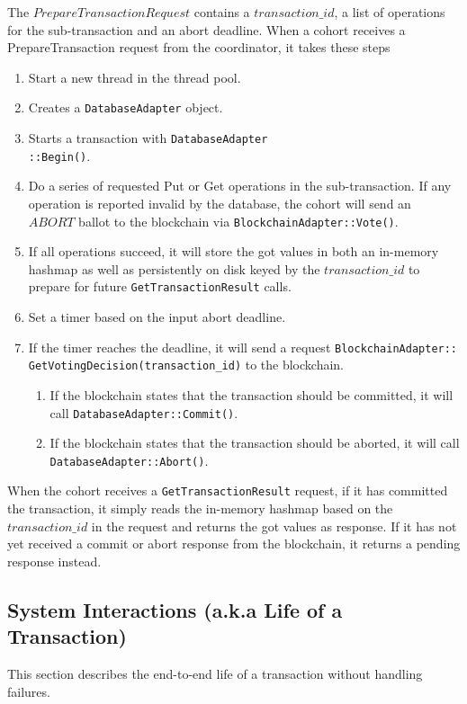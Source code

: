 \documentclass[11pt,conference]{IEEEtran}
\begin{document}
The $PrepareTransactionRequest$ contains a $transaction\_id$, a list of operations for the sub-transaction and an abort deadline. When a cohort receives a PrepareTransaction request from the coordinator, it takes these steps 
\begin{enumerate}
  \item Start a new thread in the thread pool.
  \item Creates a \texttt{DatabaseAdapter} object.
  \item Starts a transaction with 
  \texttt{DatabaseAdapter\\::Begin()}. 
  \item Do a series of requested Put or Get operations in the sub-transaction. 
If any operation is reported invalid by the database, the cohort will send an $ABORT$ ballot to the blockchain via \texttt{BlockchainAdapter::Vote()}.
  \item If all operations succeed, it will store the got values in both an in-memory hashmap as well as persistently on disk keyed by the $transaction\_id$ to prepare for future \texttt{GetTransactionResult}  calls.
  \item Set a timer based on the input abort deadline.
  \item If the timer reaches the deadline, it will send a request \texttt{BlockchainAdapter::\\GetVotingDecision(transaction\_id)} to the blockchain. 
  \begin{enumerate}
    \item If the blockchain states that the transaction should be committed, it will call \texttt{DatabaseAdapter::Commit()}.
    \item If the blockchain states that the transaction should be aborted, it will call \texttt{DatabaseAdapter::Abort()}.
  \end{enumerate}
  
\end{enumerate}



When the cohort receives a \texttt{GetTransaction\-Result} request, if it has committed the transaction, it simply reads the in-memory hashmap based on the $transaction\_id$ in the request and returns the got values as response. If it has not yet received a commit or abort response from the blockchain, it returns a pending response instead.

\subsection{System Interactions (a.k.a Life of a Transaction)} \label{txnflow}
This section describes the end-to-end life of a transaction without handling failures.
\end{document}
